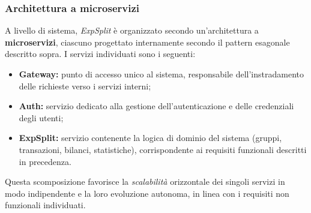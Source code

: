 \subsubsection{Architettura a microservizi}
A livello di sistema, \emph{ExpSplit} è organizzato secondo un'architettura a \textbf{microservizi}, ciascuno progettato internamente secondo il pattern esagonale descritto sopra. I servizi individuati sono i seguenti:

\begin{itemize}
    \item \textbf{Gateway:} punto di accesso unico al sistema, responsabile dell'instradamento delle richieste verso i servizi interni;
    \item \textbf{Auth:} servizio dedicato alla gestione dell'autenticazione e delle credenziali degli utenti;
    \item \textbf{ExpSplit:} servizio contenente la logica di dominio del sistema (gruppi, transazioni, bilanci, statistiche), corrispondente ai requisiti funzionali descritti in precedenza.
\end{itemize}

Questa scomposizione favorisce la \emph{scalabilità} orizzontale dei singoli servizi in modo indipendente e la loro evoluzione autonoma, in linea con i requisiti non funzionali individuati.


